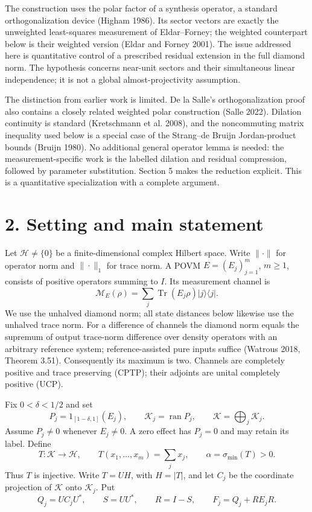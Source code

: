 \documentclass[
  11pt,
  a4paper,
]{article}
\begin{document}
The construction uses the polar factor of a synthesis operator, a
standard orthogonalization device (Higham 1986). Its sector vectors are
exactly the unweighted least-squares measurement of Eldar--Forney; the
weighted counterpart below is their weighted version (Eldar and Forney
2001). The issue addressed here is quantitative control of a prescribed
residual extension in the full diamond norm. The hypothesis concerns
near-unit sectors and their simultaneous linear independence; it is not
a global almost-projectivity assumption.

The distinction from earlier work is limited. De la Salle's
orthogonalization proof also contains a closely related weighted polar
construction (Salle 2022). Dilation continuity is standard (Kretschmann
et al. 2008), and the noncommuting matrix inequality used below is a
special case of the Strang--de Bruijn Jordan-product bounds (Bruijn
1980). No additional general operator lemma is needed: the
measurement-specific work is the labelled dilation and residual
compression, followed by parameter substitution. Section 5 makes the
reduction explicit. This is a quantitative specialization with a
complete argument.

\section{2. Setting and main
statement}\label{setting-and-main-statement}

Let \(\mathcal H\ne\{0\}\) be a finite-dimensional complex Hilbert
space. Write \(\|\cdot\|\) for operator norm and \(\|\cdot\|_1\) for
trace norm. A POVM \(E=(E_j)_{j=1}^m\), \(m\ge1\), consists of positive
operators summing to \(I\). Its measurement channel is
\[\mathcal M_E(\rho)=\sum_j\operatorname{Tr}(E_j\rho)|j\rangle\langle j|.\]
We use the unhalved diamond norm; all state distances below likewise use
the unhalved trace norm. For a difference of channels the diamond norm
equals the supremum of output trace-norm difference over density
operators with an arbitrary reference system; reference-assisted pure
inputs suffice (Watrous 2018, Theorem 3.51). Consequently its maximum is
two. Channels are completely positive and trace preserving (CPTP); their
adjoints are unital completely positive (UCP).

Fix \(0<\delta<1/2\) and set \[P_j=1_{[1-\delta,1]}(E_j),\qquad
\mathcal K_j=\operatorname{ran}P_j,\qquad
\mathcal K=\bigoplus_j\mathcal K_j.
\tag{1}\] Assume \(P_j\ne0\) whenever \(E_j\ne0\). A zero effect has
\(P_j=0\) and may retain its label. Define
\[T:\mathcal K\longrightarrow\mathcal H,\qquad
T(x_1,\ldots,x_m)=\sum_jx_j,
\qquad \alpha=\sigma_{\min}(T)>0.
\tag{2}\] Thus \(T\) is injective. Write \(T=UH\), with \(H=|T|\), and
let \(C_j\) be the coordinate projection of \(\mathcal K\) onto
\(\mathcal K_j\). Put \[Q_j=UC_jU^*,\qquad S=UU^*,\qquad R=I-S,\qquad
F_j=Q_j+RE_jR.
\tag{3}\]
\end{document}
